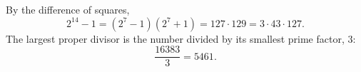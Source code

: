 By the difference of squares,
\[2^{14}-1=(2^7-1)(2^7+1)=127\cdot129=3\cdot43\cdot127.\]
The largest proper divisor is the number divided by its smallest prime factor, $3$:
\[\dfrac{16383}{3}=\boxed{5461}.\]
